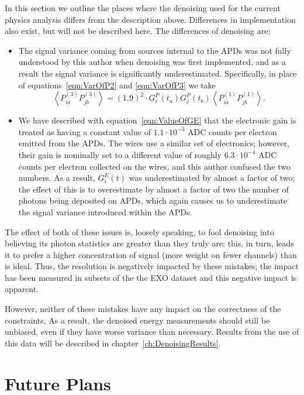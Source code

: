 In this section we outline the places where the denoising used for the current physics analysis differs from the description above.  Differences in implementation also exist, but will not be described here.  The differences of denoising are:
\begin{itemize}
\item The signal variance coming from sources internal to the APDs was not fully understood by this author when denoising was first implemented, and as a result the signal variance is significantly underestimated.  Specifically, in place of equations~\ref{eqn:VarOfP2} and \ref{eqn:VarOfP3} we take
\[\left< P^{(3)}_{ia} P^{(3)}_{jb} \right> = (1.9)^2 \cdot G^P_i(t_a)G^P_j(t_b) \left< P^{(1)}_{ia} P^{(1)}_{jb} \right>. \]
\item We have described with equation~\ref{eqn:ValueOfGE} that the electronic gain is treated as having a constant value of $1.1 \cdot 10^{-3}$ ADC counts per electron emitted from the APDs.  The wires use a similar set of electronics; however, their gain is nominally set to a different value of roughly $6.3 \cdot 10^{-4}$ ADC counts per electron collected on the wires, and this author confused the two numbers.  As a result, $G^E_i(t)$ was underestimated by almost a factor of two; the effect of this is to overestimate by almost a factor of two the number of photons being deposited on APDs, which again causes us to underestimate the signal variance introduced within the APDs.
\end{itemize}

The effect of both of these issues is, loosely speaking, to fool denoising into believing its photon statistics are greater than they truly are; this, in turn, leads it to prefer a higher concentration of signal (more weight on fewer channels) than is ideal.  Thus, the resolution is negatively impacted by these mistakes; the impact has been measured in subsets of the the EXO dataset and this negative impact is apparent.

However, neither of these mistakes have any impact on the correctness of the constraints.  As a result, the denoised energy measurements should still be unbiased, even if they have worse variance than necessary.  Results from the use of this data will be described in chapter~\ref{ch:DenoisingResults}.

\section{Future Plans}

